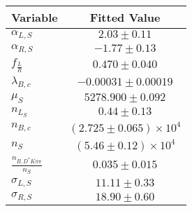 \begin{tabular}[t]{lc}
\hline
Variable &Fitted Value\\
\hline\hline
$\alpha_{L, S}$&$2.03\pm0.11$\\
\hline
$\alpha_{R, S}$&$-1.77\pm0.13$\\
\hline
$f_{\frac{L}{R}}$&$0.470\pm0.040$\\
\hline
$\lambda_{B,c}$&$-0.00031\pm0.00019$\\
\hline
$\mu_S$&$5278.900\pm0.092$\\
\hline
$n_{L_S}$&$0.44\pm0.13$\\
\hline
$n_{B,c}$&$(2.725\pm0.065)\times 10^4$\\
\hline
$n_S$&$(5.46\pm0.12)\times 10^4$\\
\hline
$\frac{n_{B,D^*K\pi\pi}}{n_S}$&$0.035\pm0.015$\\
\hline
$\sigma_{L, S}$&$11.11\pm0.33$\\
\hline
$\sigma_{R, S}$&$18.90\pm0.60$\\
\hline
\end{tabular}